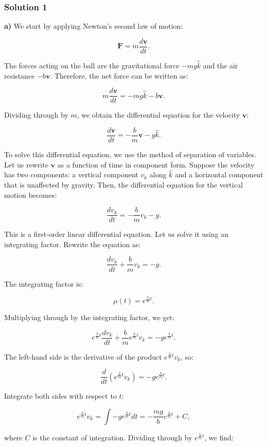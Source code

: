 \documentclass{article}
\begin{document}
\subsubsection{Solution 1}
\textbf{a)} We start by applying Newton's second law of motion:

\[
\mathbf{F} = m \frac{d\mathbf{v}}{dt}.
\]

The forces acting on the ball are the gravitational force $-mg\hat{k}$ and the air resistance $-b\mathbf{v}$. Therefore, the net force can be written as:

\[
m \frac{d\mathbf{v}}{dt} = -mg\hat{k} - b\mathbf{v}.
\]

Dividing through by $m$, we obtain the differential equation for the velocity $\mathbf{v}$:

\[
\frac{d\mathbf{v}}{dt} = -\frac{b}{m} \mathbf{v} - g\hat{k}.
\]

To solve this differential equation, we use the method of separation of variables. Let us rewrite $\mathbf{v}$ as a function of time in component form. Suppose the velocity has two components: a vertical component $v_k$ along $\hat{k}$ and a horizontal component that is unaffected by gravity. Then, the differential equation for the vertical motion becomes:

\[
\frac{d v_k}{dt} = -\frac{b}{m} v_k - g.
\]

This is a first-order linear differential equation. Let us solve it using an integrating factor. Rewrite the equation as:

\[
\frac{d v_k}{dt} + \frac{b}{m} v_k = -g.
\]

The integrating factor is:

\[
\mu(t) = e^{\frac{b}{m}t}.
\]

Multiplying through by the integrating factor, we get:

\[
e^{\frac{b}{m}t} \frac{d v_k}{dt} + \frac{b}{m} e^{\frac{b}{m}t} v_k = -g e^{\frac{b}{m}t}.
\]

The left-hand side is the derivative of the product $e^{\frac{b}{m}t} v_k$, so:

\[
\frac{d}{dt} \left( e^{\frac{b}{m}t} v_k \right) = -g e^{\frac{b}{m}t}.
\]

Integrate both sides with respect to $t$:

\[
e^{\frac{b}{m}t} v_k = \int -g e^{\frac{b}{m}t} dt = -\frac{mg}{b} e^{\frac{b}{m}t} + C,
\]

where $C$ is the constant of integration. Dividing through by $e^{\frac{b}{m}t}$, we find:
\end{document}

